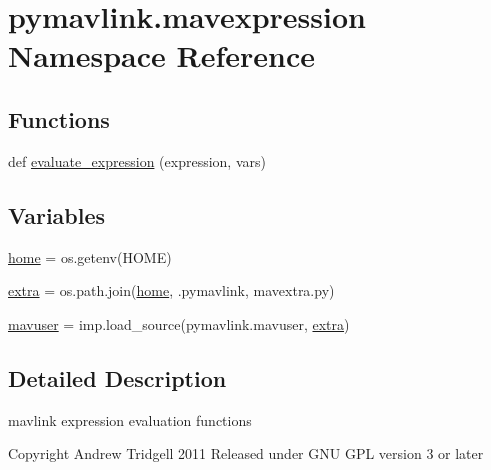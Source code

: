 \hypertarget{namespacepymavlink_1_1mavexpression}{}\section{pymavlink.\+mavexpression Namespace Reference}
\label{namespacepymavlink_1_1mavexpression}
\subsection*{Functions}
\begin{DoxyCompactItemize}
\item 
def \mbox{\hyperlink{namespacepymavlink_1_1mavexpression_a8fee43c3020a15e908bbd7c6bce1e7ca}{evaluate\+\_\+expression}} (expression, vars)
\end{DoxyCompactItemize}
\subsection*{Variables}
\begin{DoxyCompactItemize}
\item 
\mbox{\hyperlink{namespacepymavlink_1_1mavexpression_afc944dcbe25c09a86ea53d042ce147ad}{home}} = os.\+getenv(\textquotesingle{}H\+O\+ME\textquotesingle{})
\item 
\mbox{\hyperlink{namespacepymavlink_1_1mavexpression_a1a68cb085c05aa0acd7c862299f8ea74}{extra}} = os.\+path.\+join(\mbox{\hyperlink{namespacepymavlink_1_1mavexpression_afc944dcbe25c09a86ea53d042ce147ad}{home}}, \textquotesingle{}.pymavlink\textquotesingle{}, \textquotesingle{}mavextra.\+py\textquotesingle{})
\item 
\mbox{\hyperlink{namespacepymavlink_1_1mavexpression_a4b72830e24885390bf68490e1acfcec7}{mavuser}} = imp.\+load\+\_\+source(\textquotesingle{}pymavlink.\+mavuser\textquotesingle{}, \mbox{\hyperlink{namespacepymavlink_1_1mavexpression_a1a68cb085c05aa0acd7c862299f8ea74}{extra}})
\end{DoxyCompactItemize}


\subsection{Detailed Description}
\begin{DoxyVerb}mavlink expression evaluation functions

Copyright Andrew Tridgell 2011
Released under GNU GPL version 3 or later
\end{DoxyVerb}
 

